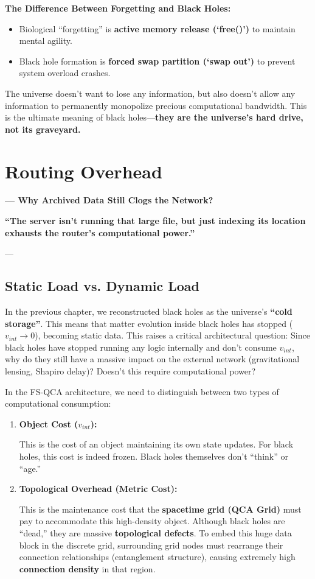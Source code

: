 \documentclass[11pt,a4paper,twoside]{book}
\begin{document}
\textbf{The Difference Between Forgetting and Black Holes:}

\begin{itemize}
\item Biological ``forgetting'' is \textbf{active memory release (`free()')} to maintain mental agility.

\item Black hole formation is \textbf{forced swap partition (`swap out')} to prevent system overload crashes.
\end{itemize}

The universe doesn't want to lose any information, but also doesn't allow any information to permanently monopolize precious computational bandwidth. This is the ultimate meaning of black holes---\textbf{they are the universe's hard drive, not its graveyard.}

 \section{Routing Overhead}

\textbf{--- Why Archived Data Still Clogs the Network?}

\textbf{``The server isn't running that large file, but just indexing its location exhausts the router's computational power.''}

---

\subsection{Static Load vs. Dynamic Load}

In the previous chapter, we reconstructed black holes as the universe's \textbf{``cold storage''}. This means that matter evolution inside black holes has stopped (\textbf{$v_{int} \to 0$}), becoming static data. This raises a critical architectural question: Since black holes have stopped running any logic internally and don't consume $v_{int}$, why do they still have a massive impact on the external network (gravitational lensing, Shapiro delay)? Doesn't this require computational power?

In the FS-QCA architecture, we need to distinguish between two types of computational consumption:

\begin{enumerate}
\item \textbf{Object Cost ($v_{int}$):}

    This is the cost of an object maintaining its own state updates. For black holes, this cost is indeed frozen. Black holes themselves don't ``think'' or ``age.''

\item \textbf{Topological Overhead (Metric Cost):}

    This is the maintenance cost that the \textbf{spacetime grid (QCA Grid)} must pay to accommodate this high-density object. Although black holes are ``dead,'' they are massive \textbf{topological defects}. To embed this huge data block in the discrete grid, surrounding grid nodes must rearrange their connection relationships (entanglement structure), causing extremely high \textbf{connection density} in that region.
\end{enumerate}
\end{document}
